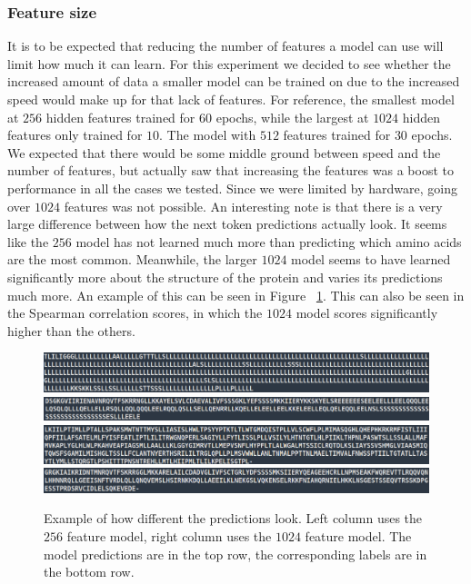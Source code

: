\subsubsection{Feature size}
It is to be expected that reducing the number of features a model can use will limit how much it can learn. For this experiment we decided to see whether the increased amount of data a smaller model can be trained on due to the increased speed would make up for that lack of features. For reference, the smallest model at $256$ hidden features trained for $60$ epochs, while the largest at $1024$ hidden features only trained for $10$. The model with $512$ features trained for $30$ epochs. We expected that there would be some middle ground between speed and the number of features, but actually saw that increasing the features was a boost to performance in all the cases we tested. Since we were limited by hardware, going over $1024$ features was not possible. An interesting note is that there is a very large difference between how the next token predictions actually look. It seems like the $256$ model has not learned much more than predicting which amino acids are the most common. Meanwhile, the larger $1024$ model seems to have learned significantly more about the structure of the protein and varies its predictions much more. An example of this can be seen in Figure ~\ref{fig:predictions}. This can also be seen in the Spearman correlation scores, in which the $1024$ model scores significantly higher than the others.


\begin{figure}[!ht]
  \centering
  \includegraphics[width=0.49\linewidth]{latex/imgs/256_prediction.png}
  \includegraphics[width=0.49\linewidth]{latex/imgs/1024_prediction.png}
  \includegraphics[width=0.49\linewidth]{latex/imgs/256_labels.png}
  \includegraphics[width=0.49\linewidth]{latex/imgs/1024_labels.png}
  \caption{Example of how different the predictions look. Left column uses the $256$ feature model, right column uses the $1024$ feature model. The model predictions are in the top row, the corresponding labels are in the bottom row.}
  \label{fig:predictions}
\end{figure}

